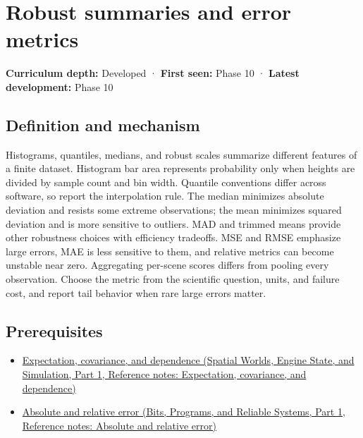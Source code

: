 \hypertarget{appendix-bcc44e9d3d02}{}\label{referencestart:appendix-bcc44e9d3d02}
\section{Robust summaries and error metrics}\label{appendix-bcc44e9d3d02-robust-summaries-and-error-metrics}

\hypertarget{appendix-bcc44e9d3d02-robust-summaries-and-error-metrics}{}

\textbf{Curriculum depth:} Developed · \textbf{First seen:} Phase 10 · \textbf{Latest development:} Phase 10

\begin{allmightroledefinition}

\subsection{Definition and mechanism}\label{appendix-bcc44e9d3d02-definition-and-mechanism}

\hypertarget{appendix-bcc44e9d3d02-definition-and-mechanism}{}

Histograms, quantiles, medians, and robust scales summarize different features of a finite dataset. Histogram bar area represents probability only when heights are divided by sample count and bin width. Quantile conventions differ across software, so report the interpolation rule. The median minimizes absolute deviation and resists some extreme observations; the mean minimizes squared deviation and is more sensitive to outliers. MAD and trimmed means provide other robustness choices with efficiency tradeoffs. MSE and RMSE emphasize large errors, MAE is less sensitive to them, and relative metrics can become unstable near zero. Aggregating per-scene scores differs from pooling every observation. Choose the metric from the scientific question, units, and failure cost, and report tail behavior when rare large errors matter.

\end{allmightroledefinition}

\subsection{Prerequisites}\label{appendix-bcc44e9d3d02-prerequisites}

\hypertarget{appendix-bcc44e9d3d02-prerequisites}{}

\begin{itemize}
\tightlist
\item
  \href{../05-Spatial-Worlds-Engine-State-and-Simulation-P01/main.pdf\#appendix-54c383df9992}{Expectation, covariance, and dependence (Spatial Worlds, Engine State, and Simulation, Part 1, Reference notes: Expectation, covariance, and dependence)}
\item
  \href{../01-Bits-Programs-and-Reliable-Systems-P01/main.pdf\#appendix-3ae74e89b4e6}{Absolute and relative error (Bits, Programs, and Reliable Systems, Part 1, Reference notes: Absolute and relative error)}
\end{itemize}

